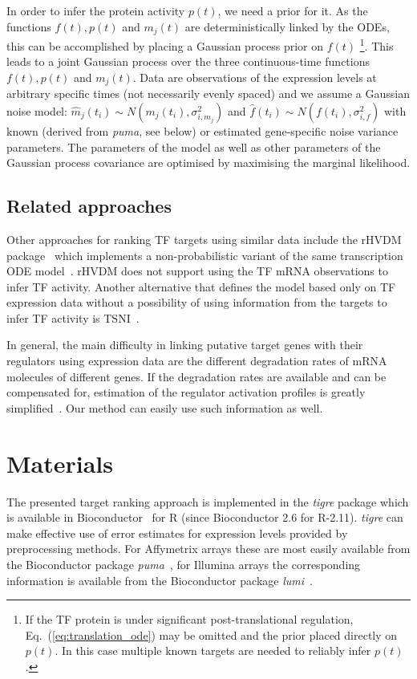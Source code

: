 \documentclass[11pt]{article}
\newcommand{\Rpackage}[1]{\emph{#1}}
\newcommand{\tigre}[0]{\Rpackage{tigre}}
\begin{document}
In order to infer the protein activity $p(t)$, we need a prior for it.
As the functions $f(t), p(t)$ and $m_j(t)$ are deterministically
linked by the ODEs, this can be accomplished by placing a Gaussian
process prior on $f(t)$ \footnote{If the TF protein is under
  significant post-translational regulation,
  Eq.~(\ref{eq:translation_ode}) may be omitted and the prior placed
  directly on $p(t)$.  In this case multiple known targets are needed
  to reliably infer $p(t)$.}.
This leads to a joint Gaussian process over the three continuous-time
functions $f(t),p(t)$ and $m_j(t)$.  Data are observations of the
expression levels at arbitrary specific times (not necessarily evenly
spaced) and we assume a Gaussian noise model: $\hat{m}_j(t_i) \sim
N(m_j(t_i),\sigma_{i,m_j}^2)$ and $\hat{f}(t_i) \sim
N(f(t_i),\sigma_{i,f}^2)$ with known (derived from \emph{puma}, see
below) or estimated gene-specific noise variance parameters. The
parameters of the model as well as other parameters of the Gaussian
process covariance are optimised by maximising the marginal
likelihood.

\subsection{Related approaches}

Other approaches for ranking TF targets using similar data include the
rHVDM package~\cite{Barenco2009} which implements a non-probabilistic
variant of the same transcription ODE model~\cite{Barenco2006a}.
rHVDM does not support using the TF mRNA observations to infer TF
activity.  Another alternative that defines the model based only on
TF expression data without a possibility of using information from the
targets to infer TF activity is TSNI~\cite{Gatta2008}.

In general, the main difficulty in linking putative target genes with
their regulators using expression data are the different degradation
rates of mRNA molecules of different genes.  If the degradation rates
are available and can be compensated for, estimation of the regulator
activation profiles is greatly simplified~\cite{Barenco2009a}.  Our
method can easily use such information as well.

\section{Materials}

The presented target ranking approach is implemented in the \tigre{}
package which is available in Bioconductor~\cite{Gentleman2004} for R
(since Bioconductor 2.6 for R-2.11).  \tigre{} can make effective use
of error estimates for expression levels provided by preprocessing
methods.  For Affymetrix arrays these are most easily available from
the Bioconductor package \Rpackage{puma}~\cite{Pearson2009}, for
Illumina arrays the corresponding information is available from the
Bioconductor package \Rpackage{lumi}~\cite{Du2008}.
\end{document}
